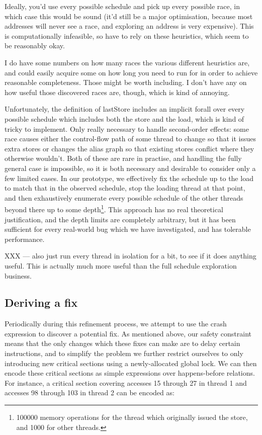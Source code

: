 \documentclass[10pt,a4paper]{report}
\begin{document}
\begin{itemize}
  Ideally, you'd use every possible schedule and pick up every
  possible race, in which case this would be sound (it'd still be a
  major optimisation, because most addresses will never see a race,
  and exploring an address is very expensive).  This is
  computationally infeasible, so have to rely on these heuristics,
  which seem to be reasonably okay.

  I do have some numbers on how many races the various different
  heuristics are, and could easily acquire some on how long you need
  to run for in order to achieve reasonable completeness.  Those might
  be worth including.  I don't have any on how useful those discovered
  races are, though, which is kind of annoying.
\end{itemize}

Unfortunately, the definition of lastStore includes an implicit forall
over every possible schedule which includes both the store and the
load, which is kind of tricky to implement.  Only really necessary to
handle second-order effects: some race causes either the control-flow
path of some thread to change so that it issues extra stores or
changes the alias graph so that existing stores conflict where they
otherwise wouldn't.  Both of these are rare in practise, and handling
the fully general case is impossible, so it is both necessary and
desirable to consider only a few limited cases.  In our prototype, we
effectively fix the schedule up to the load to match that in the
observed schedule, stop the loading thread at that point, and then
exhaustively enumerate every possible schedule of the other threads
beyond there up to some depth\footnote{100000 memory operations for
  the thread which originally issued the store, and 1000 for other
  threads.}.  This approach has no real theoretical justification, and
the depth limits are completely arbitrary, but it has been sufficient
for every real-world bug which we have investigated, and has tolerable
performance.

XXX --- also just run every thread in isolation for a bit, to see if
it does anything useful.  This is actually much more useful than the
full schedule exploration business.

\subsection{Deriving a fix}

Periodically during this refinement process, we attempt to use the
crash expression to discover a potential fix.  As mentioned above, our
safety constraint means that the only changes which these fixes can
make are to delay certain instructions, and to simplify the problem we
further restrict ourselves to only introducing new critical sections
using a newly-allocated global lock.  We can then encode these
critical sections as simple expressions over happens-before relations.
For instance, a critical section covering accesses 15 through 27 in
thread 1 and accesses 98 through 103 in thread 2 can be encoded as:
\end{document}
